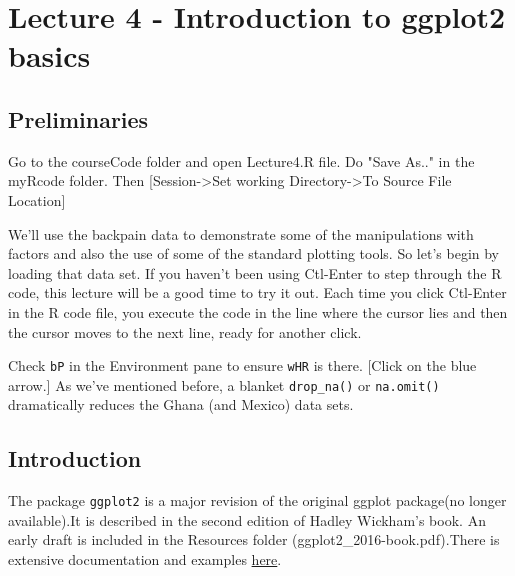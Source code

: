 \documentclass[titlepage]{book}\usepackage{knitr}
\begin{document}
\chapter{ Lecture 4 - Introduction to ggplot2 basics}

\author{Brian Williams $<$\href{mailto:bjw649@gmail.com}%
{bjw649@gmail.com}$>$}


\section{Preliminaries}

Go to the courseCode folder and open Lecture4.R file. Do "Save As.." in the myRcode folder.  
Then [Session->Set working Directory->To Source File Location]

We'll use the backpain data to demonstrate some of the manipulations with factors and also the use of some of the standard plotting tools. So let's begin by loading that data set. If you haven't been using Ctl-Enter to step through the R code, this lecture will be a good time to try it out. Each time you click Ctl-Enter in the R code file, you execute the code in the line where the cursor lies and then the cursor moves to the next line, ready for another click.

\begin{knitrout}
\color{fgcolor}\begin{kframe}
\begin{alltt}
\hlstd{(}\hlstd{)}
 \hlkwb{<-} 
\end{alltt}
\end{kframe}
\end{knitrout}


Check \texttt{bP} in the Environment pane to ensure \texttt{wHR} is there. [Click on the blue arrow.]
As we've mentioned before, a blanket \texttt{drop\_na()} or \texttt{na.omit()} dramatically reduces the Ghana (and Mexico) data sets.

\section{Introduction}

The package \texttt{ggplot2} is a major revision of the original ggplot package(no longer available).It is described in the second edition of Hadley Wickham's book. An early draft is included in the Resources folder (ggplot2\_2016-book.pdf).There is extensive documentation and examples \href{https://ggplot2.tidyverse.org/}{here}.
\end{document}
